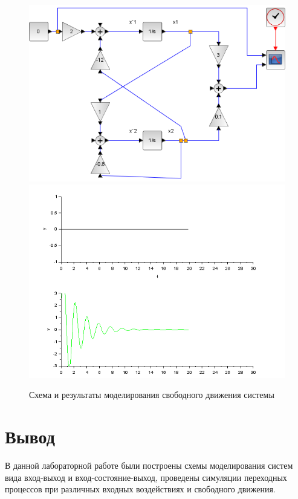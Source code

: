 \documentclass[a4paper,12pt,russian]{article} %
\begin{document}
\begin{figure}[H]
	\includegraphics[width=1\textwidth]{всв-схема-св}
	\includegraphics[width=1\textwidth]{всв-св}
	\caption{Схема и результаты моделирования свободного движения системы}
\end{figure}


\section{Вывод}
В данной лабораторной работе были построены схемы моделирования систем вида вход-выход и вход-состояние-выход, проведены симуляции переходных процессов при различных входных воздействиях и свободного движения.
\end{document}
